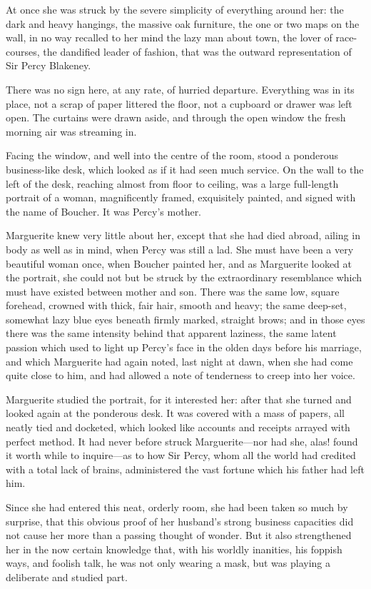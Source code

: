 At once she was struck by the severe simplicity of everything around her: the dark and heavy hangings, the massive oak furniture, the one or two maps on the wall, in no way recalled to her mind the lazy man about town, the lover of race-courses, the dandified leader of fashion, that was the outward representation of Sir Percy Blakeney.

There was no sign here, at any rate, of hurried departure. Every\-thing was in its place, not a scrap of paper littered the floor, not a cupboard or drawer was left open. The curtains were drawn aside, and through the open window the fresh morning air was streaming in.

Facing the window, and well into the centre of the room, stood a ponderous business-like desk, which looked as if it had seen much service. On the wall to the left of the desk, reaching almost from floor to ceiling, was a large full-length portrait of a woman, magnificently framed, exquisitely painted, and signed with the name of Boucher. It was Percy's mother.

Marguerite knew very little about her, except that she had died abroad, ailing in body as well as in mind, when Percy was still a lad. She must have been a very beautiful woman once, when Boucher painted her, and as Marguerite looked at the portrait, she could not but be struck by the extraordinary resemblance which must have existed between mother and son. There was the same low, square forehead, crowned with thick, fair hair, smooth and heavy; the same deep-set, somewhat lazy blue eyes beneath firmly marked, straight brows; and in those eyes there was the same intensity behind that apparent laziness, the same latent passion which used to light up Percy's face in the olden days before his marriage, and which Marguerite had again noted, last night at dawn, when she had come quite close to him, and had allowed a note of tenderness to creep into her voice.

Marguerite studied the portrait, for it interested her: after that she turned and looked again at the ponderous desk. It was covered with a mass of papers, all neatly tied and docketed, which looked like accounts and receipts arrayed with perfect method. It had never before struck Marguerite\allowbreak---\allowbreak nor had she, alas! found it worth while to inquire\allowbreak---\allowbreak as to how Sir Percy, whom all the world had credited with a total lack of brains, administered the vast fortune which his father had left him.

Since she had entered this neat, orderly room, she had been taken so much by surprise, that this obvious proof of her husband's strong business capacities did not cause her more than a passing thought of wonder. But it also strengthened her in the now certain knowledge that, with his worldly inanities, his foppish ways, and foolish talk, he was not only wearing a mask, but was playing a deliberate and studied part.

